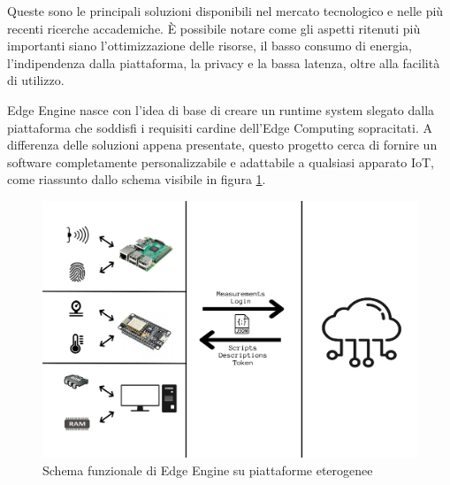 Queste sono le principali soluzioni disponibili nel mercato tecnologico e nelle più recenti ricerche accademiche. È possibile notare come gli aspetti ritenuti più importanti siano l'ottimizzazione delle risorse, il basso consumo di energia, l'indipendenza dalla piattaforma, la privacy e la bassa latenza, oltre alla facilità di utilizzo.

Edge Engine nasce con l'idea di base di creare un runtime system slegato dalla piattaforma che soddisfi i requisiti cardine dell'Edge Computing sopracitati. A differenza delle soluzioni appena presentate, questo progetto cerca di fornire un software completamente personalizzabile e adattabile a qualsiasi apparato IoT, come riassunto dallo schema visibile in figura \ref{edgecomplete}.

\begin{figure}
	\centering
	\includegraphics[width=\linewidth]{pics/edgineCP}
	\caption{Schema funzionale di Edge Engine su piattaforme eterogenee}
	\label{edgecomplete}
\end{figure}